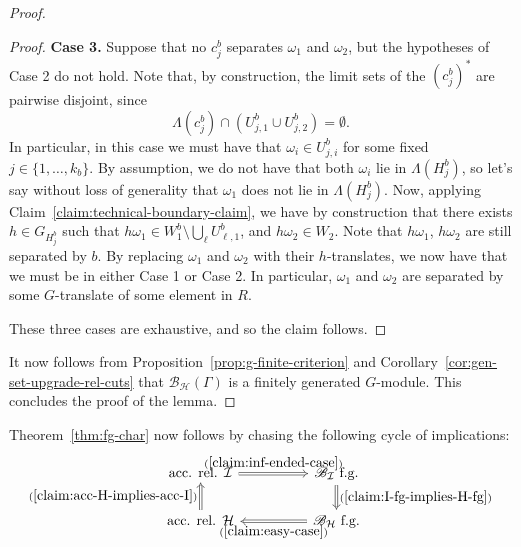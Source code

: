 \documentclass[11pt,a4paper]{amsart}
\theoremstyle{definition}
\newcommand{\per}{\mathcal{H}}
\newcommand{\br}{{\mathscr{B}}}
\begin{document}
\begin{proof}
\begin{proof}
        \textbf{Case 3.} Suppose that no $c_j^b$ separates $\omega_1$ and $\omega_2$, but the hypotheses of Case 2 do not hold. Note that, by construction, the limit sets of the $(c_{j}^b)^\ast$ are pairwise disjoint, since
        $$
        \Lambda(c^b_j) \cap (U_{j,1}^b \cup U_{j,2}^b) = \emptyset.
        $$
        In particular, in this case we must have that $\omega_i \in U_{j,i}^b$ for some fixed $j \in \{1, \ldots, k_b\}$. By assumption, we do not have that both $\omega_i$ lie in $\Lambda(H_j^b)$, so let's say without loss of generality that $\omega_1$ does not lie in $\Lambda(H_j^b)$. Now, applying Claim~\ref{claim:technical-boundary-claim}, we have by construction that there exists $h \in G_{H_j^b}$ such that $h \omega_1 \in W_1^b \setminus \bigcup _\ell U_{\ell,1}^b$, and $h \omega_2 \in W_2$. Note that $h\omega_1$, $h\omega_2$ are still separated by $b$. By replacing $\omega_1$ and $\omega_2$ with their $h$-translates, we now have that we must be in either Case 1 or Case 2. In particular, $\omega_1$ and $\omega_2$ are separated by some $G$-translate of some element in $R$. 

        These three cases are exhaustive, and so the claim follows.
        \end{proof}
        
        It now follows from Proposition~\ref{prop:g-finite-criterion} and Corollary~\ref{cor:gen-set-upgrade-rel-cuts} that $\br_\per(\Gamma)$ is a finitely generated $G$-module. This concludes the proof of the lemma. 
    \end{proof}

    Theorem~\ref{thm:fg-char} now follows by chasing the following cycle of implications:
\[\begin{tikzcd}
	{\text{acc. rel. }\mathcal I} && {\mathscr B_{\mathcal I} \text{ f.g.}} \\
	{\text{acc. rel. }\mathcal H} && {\mathscr B_{\mathcal H} \text{ f.g.}}
	\arrow["{(\ref{claim:inf-ended-case})}",  Rightarrow, from=1-1, to=1-3]
	\arrow["{(\ref{claim:I-fg-implies-H-fg})}", Rightarrow, from=1-3, to=2-3]
	\arrow["{(\ref{claim:acc-H-implies-acc-I})}", Rightarrow, from=2-1, to=1-1]
	\arrow["{(\ref{claim:easy-case})}", Rightarrow, from=2-3, to=2-1]
\end{tikzcd}\]
\end{document}

